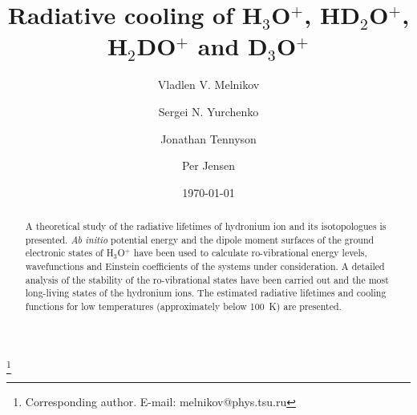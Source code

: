 \documentclass[prb,preprint,12pt,superscriptaddress,floatfix,bibnotes,nofootinbib,unsortedaddress,preprintnumbers,amsmath,amssymb]{revtex4}
\newcommand{\red}[1]{{\color{red} #1}}
\newcommand{\2}{$_{2}$}
\newcommand{\3}{$_{3}$}
\begin{document}
\title{Radiative cooling of H$_3$O$^{+}$, HD$_2$O$^{+}$, H$_2$DO$^{+}$ and D$_3$O$^{+}$}


\author{Vladlen V. Melnikov}%
\thanks{Corresponding author.
E-mail: melnikov@phys.tsu.ru} %

\author{Sergei N. Yurchenko}%

\author{Jonathan Tennyson}

\author{Per Jensen}



\date{\today}%



\begin{abstract}

    A theoretical study of the radiative lifetimes of hydronium ion and its isotopologues is presented. \textit{Ab initio} potential energy and the dipole moment surfaces of the ground electronic states of H$_3$O$^{+}$ have been used to calculate ro-vibrational energy levels, wavefunctions and Einstein coefficients of the systems under consideration. A detailed analysis of the stability of the ro-vibrational states have been carried out and the most long-living states of the hydronium  ions. The estimated radiative lifetimes and cooling functions for low temperatures (approximately below 100~K) are presented.


\end{abstract}


\maketitle
\end{document}
